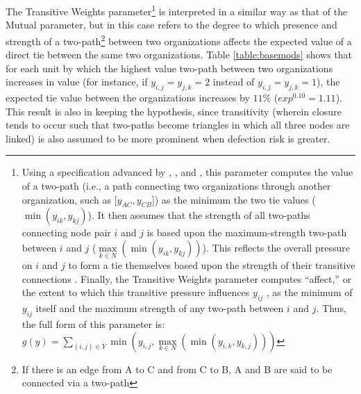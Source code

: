 \documentclass[12pt,a4paper,titlepage]{article}
\begin{document}
The Transitive Weights parameter\footnote{Using a specification advanced by \parencite{handcock2014}, \parencite{wyatt2009}, and \parencite{krivitsky2012}, this parameter computes the value of a two-path (i.e., a path connecting two organizations through another organization, such as [$y_{AC},y_{CB}$]) as the minimum the two tie values ($\min(y_{ik},y_{kj})$). It then assumes that the strength of all two-paths connecting node pair $i$ and $j$ is based upon the maximum-strength two-path between $i$ and $j$ ($\max \limits_{k \in N} (\min(y_{ik},y_{kj}))$). This reflects the overall pressure on $i$ and $j$ to form a tie themselves based upon the strength of their transitive connections \parencite{krivitsky2012}. Finally, the Transitive Weights parameter computes ``affect,'' or the extent to which this transitive pressure influences $y_{ij}$ \parencite{krivitsky2012}, as the minimum of $y_{ij}$ itself and the maximum strength of any two-path between $i$ and $j$. Thus, the full form of this parameter is: $g(y) = \sum_{(i,j) \in Y} \min(y_{i,j},\max\limits_{k \in N}(\min(y_{i,k},y_{k,j})))$} is interpreted in a similar way as that of the Mutual parameter, but in this case refers to the degree to which presence and strength of a two-path\footnote{If there is an edge from A to C and from C to B, A and B are said to be connected via a two-path} between two organizations affects the expected value of a direct tie between the same two organizations. Table \ref{table:basemods} shows that for each unit by which the highest value two-path between two organizations increases in value (for instance, if $y_{i,j} = y_{j,k} = 2$ instead of $y_{i,j} = y_{j,k} = 1$), the expected tie value between the organizations increases by $11\%$ ($exp^{0.10} = 1.11$). This result is also in keeping the \textcite{berardo2010} hypothesis, since transitivity (wherein closure tends to occur such that two-paths become triangles in which all three nodes are linked) is also assumed to be more prominent when defection risk is greater.
\end{document}
